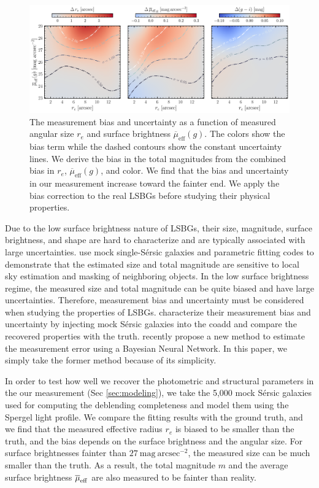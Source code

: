 \documentclass[twocolumn,astrosymb,twocolappendix]{aastex631}
\newcommand{\sbunit}{\mathrm{mag\ arcsec}^{-2}}
\newcommand{\sbeff}{\overline{\mu}_{\mathrm{eff}}(g)}
\newcommand{\sersic}{S\'ersic}
\begin{document}
\begin{CJK*}{UTF8}{gbsn}
\begin{figure}
	\vbox{ 
		\centering
		\includegraphics[width=1\linewidth]{meas_error_spergel.pdf}
	}
    \caption{The measurement bias and uncertainty as a function of measured angular size $r_e$ and surface brightness $\sbeff$. The colors show the bias term while the dashed contours show the constant uncertainty lines. We derive the bias in the total magnitudes from the combined bias in $r_e$, $\sbeff$, and color. We find that the bias and uncertainty in our measurement increase toward the fainter end. We apply the bias correction to the real LSBGs before studying their physical properties.}
    \label{fig:meas_err}
\end{figure}


Due to the low surface brightness nature of LSBGs, their size, magnitude, surface brightness, and shape are hard to characterize and are typically associated with large uncertainties. \citet{Haussler2007} use mock single-\sersic{} galaxies and parametric fitting codes to demonstrate that the estimated size and total magnitude are sensitive to local sky estimation and masking of neighboring objects. In the low surface brightness regime, the measured size and total magnitude can be quite biased and have large uncertainties. Therefore, measurement bias and uncertainty must be considered when studying the properties of LSBGs. \citet{Zaritsky2021,Zaritsky2022} characterize their measurement bias and uncertainty by injecting mock \sersic{} galaxies into the coadd and compare the recovered properties with the truth. \citet{Tanoglidis2022ICML} recently propose a new method to estimate the measurement error using a Bayesian Neural Network. In this paper, we simply take the former method because of its simplicity. 

In order to test how well we recover the photometric and structural parameters in the our measurement (Sec \ref{sec:modeling}), we take the 5,000 mock \sersic{} galaxies used for computing the deblending completeness and model them using the Spergel light profile. We compare the fitting results with the ground truth, and we find that the measured effective radius $r_e$ is biased to be smaller than the truth, and the bias depends on the surface brightness and the angular size. For surface brightnesses fainter than $27\ \sbunit$, the measured size can be much smaller than the truth. As a result, the total magnitude $m$ and the average surface brightness $\overline{\mu}_{\rm eff}$ are also measured to be fainter than reality. 


\end{CJK*}
\end{document}

